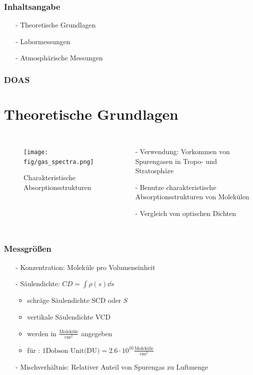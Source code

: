 \documentclass{beamer}
\begin{document}
\begin{frame}
    \frametitle{Inhaltsangabe}
    \begin{itemize}
        \item[-] Theoretische Grundlagen
    \vfill
		\item[-] Labormessungen
    \vfill
		\item[-] Atmosphärische Messungen 
	\end{itemize}
\end{frame}

\begin{frame}
    \frametitle{DOAS}
    \section{Theoretische Grundlagen}
    \begin{columns}

        \begin{figure}
        \texttt{[image: fig/gas\_spectra.png]}
        \caption{Charakteristische Absorptionsstrukturen \cite{atm_script}}
        \end{figure}
    
    	\begin{itemize}
        	\item[-] Verwendung: Vorkommen von Spurengasen in Tropo- und Stratosphäre
        	\item[-] Benutze charakteristische Absorptionsstrukturen von Molekülen
        	\item[-] Vergleich von optischen Dichten
    	\end{itemize}
	\end{columns}
\end{frame}

\begin{frame}
\frametitle{Messgrößen}
\begin{itemize}
    \item[-] Konzentration: Moleküle pro Volumeneinheit
        \pause
    \item[-] Säulendichte: $CD = \int \rho (s) \dd s$
        \begin{itemize}
            \item schräge Säulendichte SCD oder $S$
            \item vertikale Säulendichte VCD
            \item werden in $\frac{\text{Moleküle}}{\text{cm}^2}$ angegeben
            \item für : $1 \text{Dobson Unit(DU)} = 2.6 \cdot 10^{16} \frac{\text{Moleküle}}{\text{cm}^2}$ 
        \end{itemize}
        \pause
    \item[-] Mischverhältnis: Relativer Anteil von Spurengas zu Luftmenge
    \end{itemize}
\end{frame}
\end{document}
